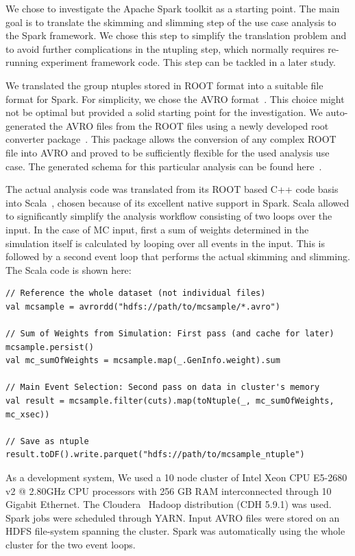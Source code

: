 \documentclass[a4paper]{jpconf}
\begin{document}
We chose to investigate the Apache Spark toolkit as a starting point. The main goal is to translate the skimming and slimming step of the use case analysis to the Spark framework. We chose this step to simplify the translation problem and to avoid further complications in the ntupling step, which normally requires re-running experiment framework code. This step can be tackled in a later study.

We translated the group ntuples stored in ROOT format into a suitable file format for Spark. For simplicity, we chose the AVRO format~\cite{avro}. This choice might not be optimal but provided a solid starting point for the investigation. We auto-generated the AVRO files from the ROOT files using a newly developed root converter package~\cite{rootconverter}. This package allows the conversion of any complex ROOT file into AVRO and proved to be sufficiently flexible for the used analysis use case. The generated schema for this particular analysis can be found here~\cite{avroschema}.

The actual analysis code was translated from its ROOT based C++ code basis into Scala~\cite{scala}, chosen because of its excellent native support in Spark. Scala allowed to significantly simplify the analysis workflow consisting of two loops over the input. In the case of MC input, first a sum of weights determined in the simulation itself is calculated by looping over all events in the input. This is followed by a second event loop that performs the actual skimming and slimming. The Scala code is shown here:

\begin{lstlisting}[style=myScalastyle]
// Reference the whole dataset (not individual files)
val mcsample = avrordd("hdfs://path/to/mcsample/*.avro")

// Sum of Weights from Simulation: First pass (and cache for later)
mcsample.persist()
val mc_sumOfWeights = mcsample.map(_.GenInfo.weight).sum

// Main Event Selection: Second pass on data in cluster's memory
val result = mcsample.filter(cuts).map(toNtuple(_, mc_sumOfWeights, mc_xsec))

// Save as ntuple
result.toDF().write.parquet("hdfs://path/to/mcsample_ntuple")
\end{lstlisting}


As a development system, We used a 10 node cluster of Intel Xeon CPU E5-2680 v2 @ 2.80GHz CPU processors with 256 GB RAM interconnected through 10 Gigabit Ethernet. The Cloudera~\cite{cloudera} Hadoop distribution (CDH 5.9.1) was used. Spark jobs were scheduled through YARN. Input AVRO files were stored on an HDFS file-system spanning the cluster. Spark was automatically using the whole cluster for the two event loops.
\end{document}
